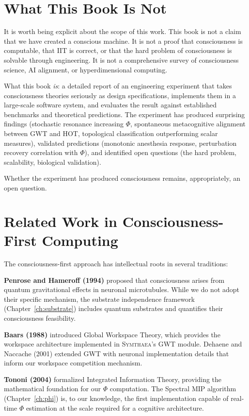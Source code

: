 \documentclass[12pt]{book}
\newcommand{\symthaea}{\textsc{Symthaea}}
\begin{document}
\section{What This Book Is Not}

It is worth being explicit about the scope of this work. This book is not a claim that we have created a conscious machine. It is not a proof that consciousness is computable, that IIT is correct, or that the hard problem of consciousness is solvable through engineering. It is not a comprehensive survey of consciousness science, AI alignment, or hyperdimensional computing.

What this book \textit{is}: a detailed report of an engineering experiment that takes consciousness theories seriously as design specifications, implements them in a large-scale software system, and evaluates the result against established benchmarks and theoretical predictions. The experiment has produced surprising findings (stochastic resonance increasing $\Phi$, spontaneous metacognitive alignment between GWT and HOT, topological classification outperforming scalar measures), validated predictions (monotonic anesthesia response, perturbation recovery correlation with $\Phi$), and identified open questions (the hard problem, scalability, biological validation).

Whether the experiment has produced consciousness remains, appropriately, an open question.

\section{Related Work in Consciousness-First Computing}

The consciousness-first approach has intellectual roots in several traditions:

\textbf{Penrose and Hameroff (1994)} proposed that consciousness arises from quantum gravitational effects in neuronal microtubules. While we do not adopt their specific mechanism, the substrate independence framework (Chapter~\ref{ch:substrate}) includes quantum substrates and quantifies their consciousness feasibility.

\textbf{Baars (1988)} introduced Global Workspace Theory, which provides the workspace architecture implemented in \symthaea{}'s GWT module. Dehaene and Naccache (2001) extended GWT with neuronal implementation details that inform our workspace competition mechanism.

\textbf{Tononi (2004)} formalized Integrated Information Theory, providing the mathematical foundation for our $\Phi$ computation. The Spectral MIP algorithm (Chapter~\ref{ch:phi}) is, to our knowledge, the first implementation capable of real-time $\Phi$ estimation at the scale required for a cognitive architecture.
\end{document}
